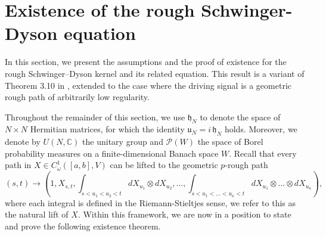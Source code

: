 \documentclass{article}%
\begin{document}
\section{Existence of the rough Schwinger-Dyson equation}\label{appendix_existence_SD}


In this section, we present the assumptions and the proof of existence for the rough Schwinger--Dyson kernel and its related equation. This result is a variant of Theorem 3.10 in \cite{cass2022combinatorial}, extended to the case where the driving signal is a geometric rough path of arbitrarily low regularity. 

Throughout the remainder of this section, we use $\mathfrak{h}_N$ to denote the space of $N \times N$ Hermitian matrices, for which the identity $\mathfrak{u}_N = i\,\mathfrak{h}_N$ holds. Moreover, we denote by $U(N, \mathbb{C})$ the unitary group and $\mathcal{P}(W)$ the space of Borel probability measures on a finite-dimensional Banach space $W$. Recall that every path in $X \in C^1_{ \omega}([a,b], V)$ can be lifted to the  geometric $p$-rough path
\[
(s,t) \to \left(1, X_{s,t}, \int_{s < u_1 < u_2 < t} dX_{u_1} \otimes dX_{u_2}, \dots, \int_{s < u_1 < \dots < u_\kappa < t} dX_{u_1} \otimes \dots \otimes dX_{u_\kappa} \right),
\]
where each integral is defined in the Riemann-Stieltjes sense, we refer to this as the natural lift of $X$.\newline
Within this framework, we are now in a position to state and prove the following existence theorem.
\end{document}
